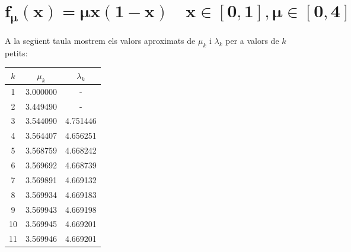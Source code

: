 \documentclass[a4paper]{article}
\theoremstyle{definition}
\begin{document}
\section{\texorpdfstring{$\boldsymbol{f_\mu(x)=\mu x(1-x)\quad x\in[0,1], \mu\in[0,4]}$}{f1}}
A la següent taula mostrem els valors aproximats de $\mu_k$ i $\lambda_k$ per a valors de $k$ petits:
\begin{table}[ht]
  \centering
  \begin{tabular}{c|c|c}
    $k$ & $\mu_k$  & $\lambda_k$ \\
    \hline
    \hline
    1   & 3.000000 & -           \\
    2   & 3.449490 & -           \\
    3   & 3.544090 & 4.751446    \\
    4   & 3.564407 & 4.656251    \\
    5   & 3.568759 & 4.668242    \\
    6   & 3.569692 & 4.668739    \\
    7   & 3.569891 & 4.669132    \\
    8   & 3.569934 & 4.669183    \\
    9   & 3.569943 & 4.669198    \\
    10  & 3.569945 & 4.669201    \\
    11  & 3.569946 & 4.669201
  \end{tabular}
\end{table}
\end{document}
